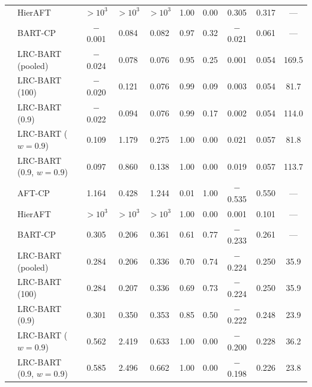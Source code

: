 \begin{center}
\begin{longtable}{llcccccccc}
& HierAFT & $>\!10^{3}$ & $>\!10^{3}$ & $>\!10^{3}$ & 1.00 & 0.00 & 0.305 & 0.317 & --- \\
& BART-CP & $-$0.001 & 0.084 & 0.082 & 0.97 & 0.32 & $-$0.021 & 0.061 & --- \\
& LRC-BART (pooled) & $-$0.024 & 0.078 & 0.076 & 0.95 & 0.25 & 0.001 & 0.054 & 169.5 \\
& LRC-BART (100) & $-$0.020 & 0.121 & 0.076 & 0.99 & 0.09 & 0.003 & 0.054 & 81.7 \\
& LRC-BART (0.9) & $-$0.022 & 0.094 & 0.076 & 0.99 & 0.17 & 0.002 & 0.054 & 114.0 \\
& LRC-BART ($w=0.9$) & 0.109 & 1.179 & 0.275 & 1.00 & 0.00 & 0.021 & 0.057 & 81.8 \\
& LRC-BART (0.9, $w=0.9$) & 0.097 & 0.860 & 0.138 & 1.00 & 0.00 & 0.019 & 0.057 & 113.7 \\
\midrule
{} & AFT-CP & 1.164 & 0.428 & 1.244 & 0.01 & 1.00 & $-$0.535 & 0.550 & --- \\
& HierAFT & $>\!10^{3}$ & $>\!10^{3}$ & $>\!10^{3}$ & 1.00 & 0.00 & 0.001 & 0.101 & --- \\
& BART-CP & 0.305 & 0.206 & 0.361 & 0.61 & 0.77 & $-$0.233 & 0.261 & --- \\
& LRC-BART (pooled) & 0.284 & 0.206 & 0.336 & 0.70 & 0.74 & $-$0.224 & 0.250 & 35.9 \\
& LRC-BART (100) & 0.284 & 0.207 & 0.336 & 0.69 & 0.73 & $-$0.224 & 0.250 & 35.9 \\
& LRC-BART (0.9) & 0.301 & 0.350 & 0.353 & 0.85 & 0.50 & $-$0.222 & 0.248 & 23.9 \\
& LRC-BART ($w=0.9$) & 0.562 & 2.419 & 0.633 & 1.00 & 0.00 & $-$0.200 & 0.228 & 36.2 \\
& LRC-BART (0.9, $w=0.9$) & 0.585 & 2.496 & 0.662 & 1.00 & 0.00 & $-$0.198 & 0.226 & 23.8 \\
\end{longtable}
\end{center}

